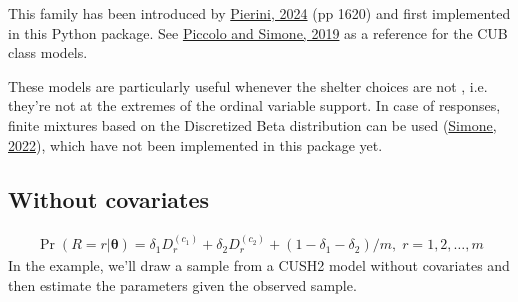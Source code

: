 \documentclass[letterpaper,10pt,english]{sphinxmanual}
\begin{document}
\sphinxAtStartPar
This family has been introduced by \hyperlink{cite.references:id41}{Pierini, 2024} (pp 16\sphinxhyphen{}20) and first
implemented in this Python package. See \hyperlink{cite.references:id3}{Piccolo and Simone, 2019} as a reference
for the CUB class models.

\sphinxAtStartPar
These models are particularly useful whenever the shelter choices are not
, i.e. they’re not at the extremes of the ordinal variable support.
In case of  responses,
finite mixtures based on the Discretized Beta distribution can be
used (\hyperlink{cite.references:id12}{Simone, 2022}), which have not been implemented in this package yet.


\subsection{Without covariates}
\label{\detokenize{manual:cush2-without-covariates}}\label{\detokenize{manual:id25}}
\sphinxAtStartPar
{}
\begin{equation*}
\begin{split}\Pr(R=r|\pmb\theta) = \delta_1 D_r^{(c_1)} + \delta_2 D_r^{(c_2)} + (1-\delta_1-\delta_2)/m
,\; r=1,2,\ldots,m\end{split}
\end{equation*}
\sphinxAtStartPar
In the example, we’ll draw a sample from a CUSH2 model without covariates and
then estimate the parameters given the observed sample.
\end{document}
